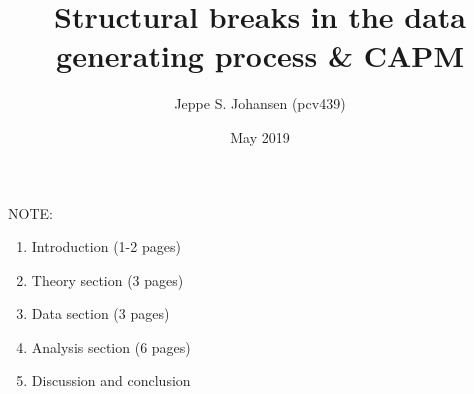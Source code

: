 \documentclass{article}
\title{Structural breaks in the data generating process \& CAPM}
\author{Jeppe S. Johansen (pcv439)}
\date{May 2019}
\begin{document}
NOTE:

\begin{enumerate}
  \item Introduction (1-2 pages)
  \item Theory section (3 pages)
  \item Data section (3 pages)
  \item Analysis section (6 pages)
  \item Discussion and conclusion
\end{enumerate}

\maketitle

%

\pagebreak



\newpage
\end{document}
